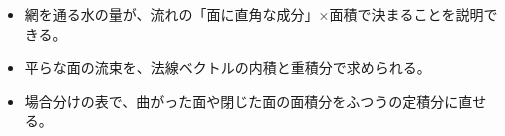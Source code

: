 \newcommand\kviiiibox[1]{\par\addvspace{3pt}\noindent\textbf{#1}\par\vspace{3pt}\noindent\ignorespaces}
\newcommand\kviiiiline[1]{\par\addvspace{3pt}{\centering #1\par}\addvspace{3pt}\noindent\ignorespaces}
\newcommand\kviiiiframe[2][100mm]{\par\addvspace{4pt}{\centering\tikz\node[draw=\bkTT, line width=0.9pt, fill=bkTheme!6, rounded corners=1.5mm, inner xsep=6mm, inner ysep=2.5mm, align=center]{#2};\par}\addvspace{4pt}\noindent\ignorespaces}
\newcommand\kviiiia{\par\vspace{2pt}\noindent\rightskip=0pt plus 8em\relax\hangindent=2.6\zw\hangafter=0\relax}
\newcommand\kviiiib{\par\vspace{2pt}\noindent\rightskip=0pt plus 8em\relax\hangindent=4.3\zw\hangafter=0\relax}
\newcommand\kviiiis{\rightskip=0pt plus 8em\relax}
\newcommand\kviiiinet[3]{\begin{scope}[shift={#1}]
  \fill[bkBlueBg] (0,0) rectangle (52,34);
  \draw[bkGray, line width=0.9pt] (0,0) -- (52,0) (0,34) -- (52,34);
  \foreach \kviiiiy in {6,13,21,28} {\draw[kviiii flow] (2,\kviiiiy) -- (12,\kviiiiy); \draw[kviiii flow] (40,\kviiiiy) -- (50,\kviiiiy);}
  \begin{scope}[shift={(26,17)}, rotate=#2]
    \draw[kviiii net] (0,-11) -- (0,11);
    \foreach \kviiiiw in {-9,-6,...,9} {\draw[bkInk!50, line width=0.4pt] (-0.9,\kviiiiw) -- (0.9,\kviiiiw);}
  \end{scope}
  \node[kviiii lab, anchor=north, align=center] at (26,-1.5) {#3};
\end{scope}}
\makeatother


\begin{goal}
\begin{itemize}[label={\color{\bkTT}●}, leftmargin=1.6\zw, itemsep=0pt, topsep=1pt]
\item {}\enspace 網を通る水の量が、流れの「面に直角な成分」×面積で決まることを説明できる。
\item {}\enspace 平らな面の流束を、法線ベクトルの内積と重積分で求められる。
\item {}\enspace 場合分けの表で、曲がった面や閉じた面の面積分をふつうの定積分に直せる。
\end{itemize}
\end{goal}

